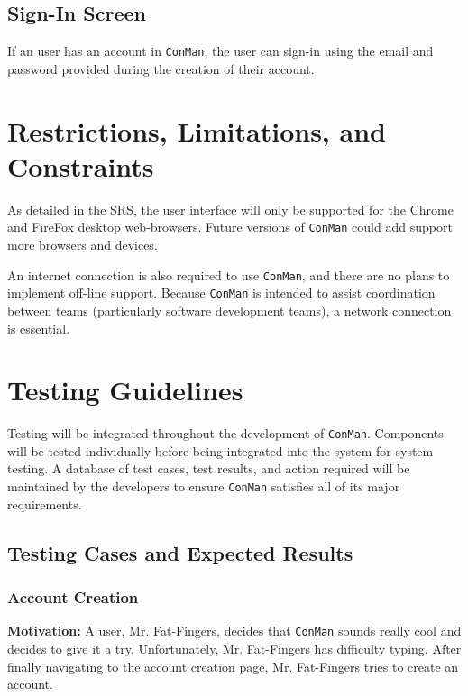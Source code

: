 \documentclass{article}
\begin{document}
\subsection{Sign-In Screen}
If an user has an account in \texttt{ConMan}, the user can sign-in using the email and 
password provided during the creation of their account.


\newpage
\section{Restrictions, Limitations, and Constraints}
As detailed in the SRS, the user interface will only be supported for the Chrome and FireFox desktop web-browsers.
Future versions of \texttt{ConMan} could add support more browsers and devices.

An internet connection is also required to use \texttt{ConMan}, and there are no plans to implement off-line support.
Because \texttt{ConMan} is intended to assist coordination between teams (particularly software development teams), a network connection is essential.
\newpage
\section{Testing Guidelines}
Testing will be integrated throughout the development of \texttt{ConMan}.  Components will be tested individually before being integrated into the system for system testing.
A database of test cases, test results, and action required will be maintained by the developers to ensure \texttt{ConMan} satisfies all of its major requirements.

\subsection{Testing Cases and Expected Results}
\subsubsection{Account Creation}
\textbf{Motivation:}  A user, Mr. Fat-Fingers, decides that \texttt{ConMan} sounds really cool and decides to give it a try.  Unfortunately, Mr. Fat-Fingers has difficulty typing.  After finally navigating to the account creation page, Mr. Fat-Fingers tries to create an account.  
\end{document}
